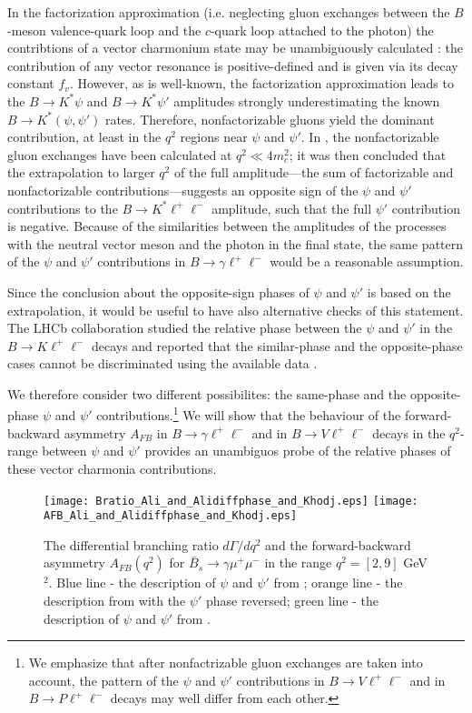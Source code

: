 \documentclass{PoS}
\begin{document}
In the factorization approximation (i.e. neglecting gluon exchanges between the $B$-meson valence-quark loop and the 
$c$-quark loop attached to the photon) the contribtions of a vector charmonium state may be unambiguously calculated \cite{ali,sehgal}: 
the contribution of any vector resonance is positive-defined and is given via its decay constant $f_v$. 
However, as is well-known, the factorization approximation leads to the $B\to K^*\psi$ and $B\to K^*\psi'$ amplitudes strongly 
underestimating the known $B\to K^*(\psi,\psi')$ rates. 
Therefore, nonfactorizable gluons yield the dominant contribution, at least in the $q^2$ regions near $\psi$ and $\psi'$. 
In \cite{khodj}, the nonfactorizable gluon exchanges have been calculated at $q^2\ll 4m_c^2$; it was then 
concluded that the extrapolation to larger $q^2$ of the full amplitude---the sum of factorizable and nonfactorizable contributions---suggests 
an opposite sign of the $\psi$ and $\psi'$ contributions to the $B\to K^*\ell^+\ell^-$ amplitude, such that the full $\psi'$ contribution is negative. 
Because of the similarities between the amplitudes of the processes with the neutral vector meson and the photon in the final state, 
the same pattern of the $\psi$ and $\psi'$ contributions in $B\to \gamma \ell^+\ell^-$ would be a reasonable assumption. 

Since the conclusion about the opposite-sign phases of $\psi $ and $\psi'$ is based on the extrapolation, 
it would be useful to have also alternative checks of this statement. The LHCb collaboration studied the relative 
phase between the $\psi$ and $\psi'$ in the $B\to K\ell^+\ell^-$ decays and reported that the similar-phase and the opposite-phase cases 
cannot be discriminated using the available data \cite{lhcb}. 

We therefore consider two different possibilites: the same-phase and the opposite-phase 
$\psi$ and $\psi'$ contributions.\footnote{We emphasize 
that after nonfactrizable gluon exchanges are taken into account, the pattern of the $\psi$ and $\psi'$ 
contributions in $B\to V\ell^+\ell^-$ and in $B\to P\ell^+\ell^-$ decays may well differ from each other.} 
We will show that the behaviour of the forward-backward asymmetry 
$A_{FB}$ in $B\to \gamma \ell^+\ell^-$ and in $B\to V \ell^+\ell^-$ decays in the $q^2$-range between $\psi$ and $\psi'$ 
provides an unambiguos probe of the relative phases of these vector charmonia contributions. 

\begin{figure}[b]
\centering
\texttt{[image: Bratio\_Ali\_and\_Alidiffphase\_and\_Khodj.eps]}
\hspace{10mm}
\texttt{[image: AFB\_Ali\_and\_Alidiffphase\_and\_Khodj.eps]}
\caption{The differential branching ratio $d\Gamma/dq^2$ and the forward-backward asymmetry $A_{FB}(q^2)$ for $\bar{B}_{s}\to\gamma\mu^+\mu^-$ 
in the range $q^2=[2,9]$ GeV$^2$. Blue line - the description of $\psi$ and $\psi'$ from \cite{ali}; 
orange line - the description from \cite{ali} with the $\psi'$ phase reversed; 
green line - the description of $\psi$ and $\psi'$ from \cite{khodj}.}
\label{fig-br}      
\end{figure}
\end{document}
